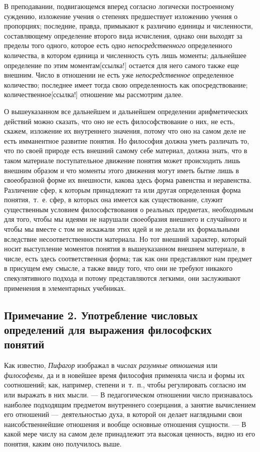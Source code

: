 {В преподавании, подвигающемся вперед согласно логически построенному
суждению, изложение учения о степенях предшествует изложению учения о
пропорциях; последние, правда, примыкают к различию единицы и численности,
составляющему определение второго вида исчисления, однако они выходят за
пределы того одного, которое есть одно
{\em непосредственного} определенного количества, в
котором единица и численность суть лишь моменты; дальнейшее определение по
этим моментам[ссылка!] остается для него
самого также еще внешним. Число в отношении не есть уже
{\em непосредственное} определенное количество;
последнее имеет тогда свою определенность как опосредствование;
количественное[ссылка!] отношение мы рассмотрим
далее.

О вышеуказанном все дальнейшем и дальнейшем определении арифметических
действий можно сказать, что оно не есть философствование о них, не есть,
скажем, изложение их внутреннего значения, потому что оно на самом деле не
есть имманентное развитие понятия. Но философия должна уметь различать то,
что по своей природе есть внешний самому себе материал, должна знать, что в
таком материале поступательное движение понятия может происходить лишь
внешним образом и что моменты этого движения могут иметь бытие лишь в
своеобразной форме их внешности, какова здесь форма равенства и
неравенства. Различение сфер, к которым принадлежит та или другая
определенная форма понятия,~т.~е. сфер, в которых она имеется как
существование, служит существенным условием философствования о реальных
предметах, необходимым для того, чтобы мы идеями не нарушали своеобразия
внешнего и случайного и чтобы мы вместе с том не искажали этих идей и не
делали их формальными вследствие несоответственности материала. Но тот
внешний характер, который носит выступление моментов понятия в
вышеуказанном внешнем материале, в числе, есть здесь соответственная форма;
так как они представляют нам предмет в присущем ему смысле, а также ввиду
того, что они не требуют никакого спекулятивного подхода и потому
представляются легкими, они заслуживают применения в элементарных
учебниках.

\subsection*{Примечание 2. Употребление числовых определений для
выражения философских понятий}

Как известно, {\em Пифагор} изображал в
{\em числах разумные отношения} или
{\em философемы}, да и в новейшее время философия
применяла числа и формы их соотношений; как, например, степени и~т.~п.,
чтобы регулировать согласно им или выражать в них мысли. — В педагогическом
отношении число признавалось наиболее подходящим предметом внутреннего
созерцания, а занятие вычислением его отношений —~деятельностью духа, в
которой он делает наглядными свои наисобственнейшие отношения и вообще
основные отношения сущности. — В какой мере числу на самом деле принадлежит
эта высокая ценность, видно из его понятия, каким оно получилось выше.

}
